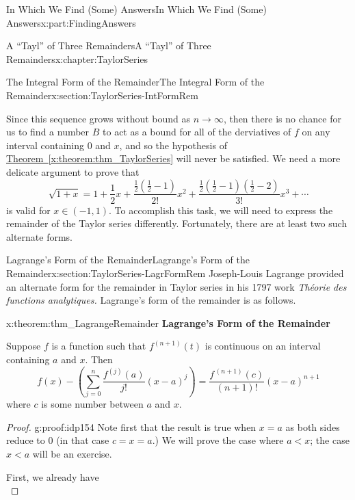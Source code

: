 \documentclass[oneside,10pt,]{book}
\newcommand{\xreffont}{\relax}
\newcommand{\terminology}[1]{\textbf{#1}}
\newcommand{\pubtitle}[1]{\textsl{#1}}
\numberwithin{equation}{section}
\newcommand{\lt}{<}
\begin{document}
\begin{partptx}{In Which We Find (Some) Answers}{}{In Which We Find (Some) Answers}{}{}{x:part:FindingAnswers}
\begin{chapterptx}{A ``Tayl'' of Three Remainders}{}{A ``Tayl'' of Three Remainders}{}{}{x:chapter:TaylorSeries}
\begin{sectionptx}{The Integral Form of the Remainder}{}{The Integral Form of the Remainder}{}{}{x:section:TaylorSeries-IntFormRem}
\begin{equation*}
\end{equation*}
%
\par
Since this sequence grows without bound as \(n\rightarrow\infty\), then there is no chance for us to find a number \(B\) to act as a bound for all of the derviatives of \(f\) on any interval containing 0 and\(\) \(x\), and so the hypothesis of \hyperref[x:theorem:thm_TaylorSeries]{Theorem~{\xreffont\ref{x:theorem:thm_TaylorSeries}}} will never be satisfied. We need a more delicate argument to prove that%
\begin{equation*}
\sqrt{1+x}=1+\frac{1}{2}x+\frac{\frac{1}{2}\left(\frac{1}{2}-1\right)}{2!}x^2+\frac{\frac{1}{2}\left(\frac{1}{2}-1\right)\left(\frac{1}{2}-2\right)}{3!}x^3+\cdots
\end{equation*}
is valid for \(x\in(-1,1)\). To accomplish this task, we will need to express the remainder of the Taylor series differently. Fortunately, there are at least two such alternate forms.%
\end{sectionptx}
%
%
\typeout{************************************************}
\typeout{************************************************}
%
\begin{sectionptx}{Lagrange's Form of the Remainder}{}{Lagrange's Form of the Remainder}{}{}{x:section:TaylorSeries-LagrFormRem}
Joseph-Louis Lagrange  provided an alternate form for the remainder in Taylor series in his 1797 work \pubtitle{Théorie des functions analytiques.} Lagrange's form of the remainder is as follows.%
\begin{theorem}{}{}{x:theorem:thm_LagrangeRemainder}%
\terminology{Lagrange's Form of the Remainder}%
\par
{} Suppose \(f\) is a function such that \(f^{(n+1)}(t)\) is continuous on an interval containing \(a\) and \(x\). Then%
\begin{equation*}
f(x)-\left(\sum_{j=0}^n\frac{f^{(j)}(a)}{j!}(x-a)^j\right)=\frac{f^{\, (n+1)}(c)}{(n+1)!}(x-a)^{n+1}
\end{equation*}
where \(c\) is some number between \(a\) and \(x\).%
\end{theorem}
\begin{proof}{}{g:proof:idp154}
Note first that the result is true when \(x=a\) as both sides reduce to 0 (in that case \(c=x=a\).) We will prove the case where \(a\lt x\); the case \(x\lt a\) will be an exercise.%
\par
First, we already have%
\begin{equation*}

\end{equation*}
\end{proof}
\end{sectionptx}
\end{chapterptx}
\end{partptx}
\end{document}
